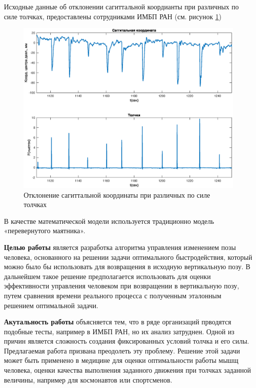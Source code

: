 \documentclass[a4paper,12pt, openany]{book}
\theoremstyle{plain} %
\theoremstyle{definition} %
\theoremstyle{remark} %
\numberwithin{equation}{chapter}
\begin{document}
{Исходные данные об отклонении сагиттальной коордианты при различных по силе толчках, предоставлены сотрудниками ИМБП РАН (см. рисунок \ref{fig:pushes})
\begin{figure}[h!]
    \centering
    \includegraphics[width=1\linewidth]{sagg_and_pushes.eps}
    \caption{Отклонение сагиттальной координаты при различных по силе толчках}
    \label{fig:pushes}
\end{figure}

В качестве математической модели
используется традиционно модель «перевернутого маятника»\cite{PAKrychinin,gurfincel}.


\textbf{Целью работы} является разработка алгоритма управления изменением позы человека, основанного на решении задачи оптимального быстродействия,
который можно было бы использовать для возвращения в исходную вертикальную позу. В дальнейшем
такое решение предполагается использовать для оценки эффективности управления человеком
при возвращении в вертикальную позу, путем сравнения
времени реального процесса с полученным эталонным решением оптимальной задачи.

\textbf{Акутальность работы} объясняется тем, что в ряде организаций прводятся подобные тесты, например в ИМБП РАН, но их анализ затруднен.
Одной из причин является сложность создания фиксированных условий толчка и его силы. Предлагаемая работа призвана преодолеть эту проблему.
Решение этой задачи может быть применено в медицине для оценки оптимальности работы мышщ человека, оценки качества выполнения заданного движения
при толчках заданной величины, например для космонавтов или спортсменов.

}
\end{document}

